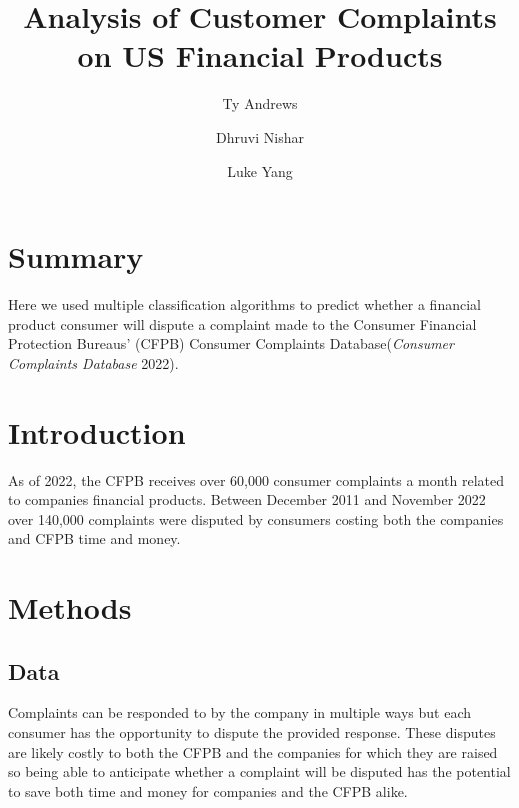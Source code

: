 \documentclass[
  letterpaper,
  DIV=11,
  numbers=noendperiod]{scrartcl}
\title{Analysis of Customer Complaints on US Financial Products}
\author{Ty Andrews \and Dhruvi Nishar \and Luke Yang}
\date{}
\renewcommand*\contentsname{Table of contents}
\newcommand\contentsname{Table of contents}
\begin{document}
\maketitle
\ifdefined\Shaded\renewenvironment{Shaded}{\begin{tcolorbox}[borderline west={3pt}{0pt}{shadecolor}, interior hidden, sharp corners, enhanced, breakable, frame hidden, boxrule=0pt]}{\end{tcolorbox}}\fi

\renewcommand*\contentsname{Table of contents}
{
\hypersetup{linkcolor=}
\setcounter{tocdepth}{3}
\tableofcontents
}
\hypertarget{summary}{%
\section{Summary}\label{summary}}

Here we used multiple classification algorithms to predict whether a
financial product consumer will dispute a complaint made to the Consumer
Financial Protection Bureaus' (CFPB) Consumer Complaints
Database(\emph{Consumer Complaints Database} 2022).

\hypertarget{introduction}{%
\section{Introduction}\label{introduction}}

As of 2022, the CFPB receives over 60,000 consumer complaints a month
related to companies financial products. Between December 2011 and
November 2022 over 140,000 complaints were disputed by consumers costing
both the companies and CFPB time and money.

\hypertarget{methods}{%
\section{Methods}\label{methods}}

\hypertarget{data}{%
\subsection{Data}\label{data}}

Complaints can be responded to by the company in multiple ways but each
consumer has the opportunity to dispute the provided response. These
disputes are likely costly to both the CFPB and the companies for which
they are raised so being able to anticipate whether a complaint will be
disputed has the potential to save both time and money for companies and
the CFPB alike.
\end{document}
